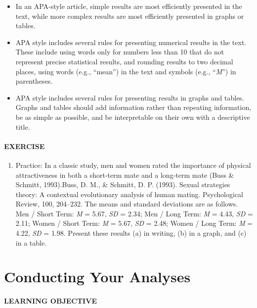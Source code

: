 \documentclass[
]{krantz}
\providecommand{\tightlist}{%
  \setlength{\itemsep}{0pt}\setlength{\parskip}{0pt}}
\begin{document}
\begin{itemize}
\tightlist
\item
  In an APA-style article, simple results are most efficiently presented in the text, while more complex results are most efficiently presented in graphs or tables.
\item
  APA style includes several rules for presenting numerical results in the text. These include using words only for numbers less than 10 that do not represent precise statistical results, and rounding results to two decimal places, using words (e.g., ``mean'') in the text and symbols (e.g., ``\emph{M}'') in parentheses.
\item
  APA style includes several rules for presenting results in graphs and tables. Graphs and tables should add information rather than repeating information, be as simple as possible, and be interpretable on their own with a descriptive title.
\end{itemize}

\hypertarget{exercise-7}{%
\paragraph*{EXERCISE}\label{exercise-7}}

\begin{enumerate}
\def\labelenumi{\arabic{enumi}.}
\tightlist
\item
  Practice: In a classic study, men and women rated the importance of physical attractiveness in both a short-term mate and a long-term mate (Buss \& Schmitt, 1993).Buss, D. M., \& Schmitt, D. P. (1993). Sexual strategies theory: A contextual evolutionary analysis of human mating. Psychological Review, 100, 204--232. The means and standard deviations are as follows. Men / Short Term: \emph{M} = 5.67, \emph{SD} = 2.34; Men / Long Term: \emph{M} = 4.43, \emph{SD} = 2.11; Women / Short Term: \emph{M} = 5.67, \emph{SD} = 2.48; Women / Long Term: \emph{M} = 4.22, \emph{SD} = 1.98. Present these results (a) in writing, (b) in a graph, and (c) in a table.
\end{enumerate}

\hypertarget{conducting-your-analyses}{%
\section{Conducting Your Analyses}\label{conducting-your-analyses}}

\hypertarget{learning-objective}{%
\paragraph*{LEARNING OBJECTIVE}\label{learning-objective}}
\end{document}
